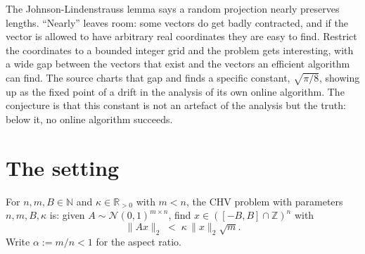 \documentclass{aicr-conjecture}
\newcommand{\Z}{\mathbb{Z}}
\newcommand{\R}{\mathbb{R}}
\newcommand{\CHV}{\mathrm{CHV}}
\begin{document}

\vspace{0.4em}

\begin{informalconjecture}
The Johnson-Lindenstrauss lemma says a random projection nearly preserves
lengths. ``Nearly'' leaves room: some vectors do get badly contracted,
and if the vector is allowed to have arbitrary real coordinates they are
easy to find. Restrict the coordinates to a bounded integer grid and the
problem gets interesting, with a wide gap between the vectors that exist
and the vectors an efficient algorithm can find. The source charts that
gap and finds a specific constant, $\sqrt{\pi/8}$, showing up as the
fixed point of a drift in the analysis of its own online algorithm. The
conjecture is that this constant is not an artefact of the analysis but
the truth: below it, no online algorithm succeeds.
\end{informalconjecture}

\section{The setting}\label{sec:setting}

\begin{definition}\label{def:chv}
For $n, m, B \in \mathbb{N}$ and $\kappa \in \R_{>0}$ with $m < n$, the
$\CHV$ problem with parameters $n, m, B, \kappa$ is: given $A \sim
\mathcal{N}(0,1)^{m \times n}$, find $x \in ([-B,B] \cap \Z)^{n}$ with
\[
  \|Ax\|_{2} \;<\; \kappa\,\|x\|_{2}\sqrt{m}.
\]
Write $\alpha := m/n < 1$ for the aspect ratio.
\end{definition}
\end{document}

